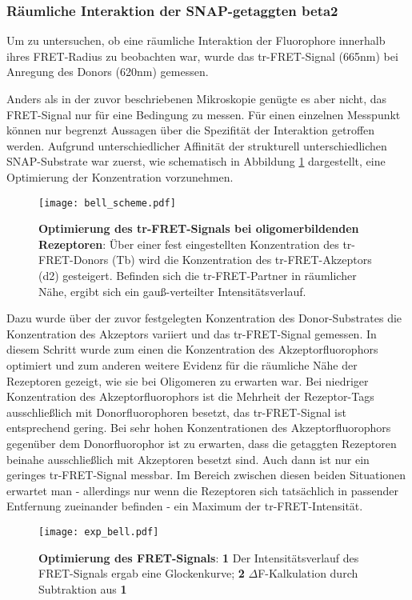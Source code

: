 \subsubsection{Räumliche Interaktion der SNAP-getaggten \gls{beta2}}
\label{bell}
Um zu untersuchen, ob eine räumliche Interaktion der Fluorophore innerhalb ihres FRET-Radius zu beobachten war, wurde das tr-FRET-Signal (665nm) bei Anregung des Donors (620nm) gemessen. 

Anders als in der zuvor beschriebenen Mikroskopie genügte es aber nicht, das FRET-Signal nur für eine Bedingung zu messen. Für einen einzelnen Messpunkt können nur begrenzt Aussagen über die Spezifität der Interaktion getroffen werden. Aufgrund unterschiedlicher Affinität der strukturell unterschiedlichen SNAP-Substrate war zuerst, wie schematisch in Abbildung \ref{fig:bell} dargestellt, eine Optimierung der Konzentration vorzunehmen.

\begin{figure}[htbp]
	\centering
    \texttt{[image: bell\_scheme.pdf]}
    \caption{\textbf{Optimierung des tr-FRET-Signals bei oligomerbildenden Rezeptoren}: Über einer fest eingestellten Konzentration des tr-FRET-Donors (Tb) wird die Konzentration des tr-FRET-Akzeptors (d2) gesteigert. Befinden sich die tr-FRET-Partner in räumlicher Nähe, ergibt sich ein gauß-verteilter Intensitätsverlauf.}
\label{fig:bell}
\end{figure}

 Dazu wurde über der zuvor festgelegten Konzentration des Donor-Substrates die Konzentration des Akzeptors variiert und das tr-FRET-Signal gemessen. In diesem Schritt wurde zum einen die Konzentration des Akzeptorfluorophors optimiert und zum anderen weitere Evidenz für die räumliche Nähe der Rezeptoren gezeigt, wie sie bei Oligomeren zu erwarten war. Bei niedriger Konzentration des Akzeptorfluorophors ist die Mehrheit der Rezeptor-Tags ausschließlich mit Donorfluorophoren besetzt, das tr-FRET-Signal ist entsprechend gering. Bei sehr hohen Konzentrationen des Akzeptorfluorophors gegenüber dem Donorfluorophor ist zu erwarten, dass die getaggten Rezeptoren beinahe ausschließlich mit Akzeptoren besetzt sind. Auch dann ist nur ein geringes tr-FRET-Signal messbar. Im Bereich zwischen diesen beiden Situationen erwartet man - allerdings nur wenn die Rezeptoren sich tatsächlich in passender Entfernung zueinander befinden - ein Maximum der tr-FRET-Intensität.

\begin{figure}[htbp]
	\centering
    \texttt{[image: exp\_bell.pdf]}
    \caption{\textbf{Optimierung des FRET-Signals}: \textbf{1} Der Intensitätsverlauf des FRET-Signals ergab eine Glockenkurve;  \textbf{2} $\Delta$F-Kalkulation durch Subtraktion aus \textbf{1}} 
    \label{fig:exp_bell}
\end{figure}

